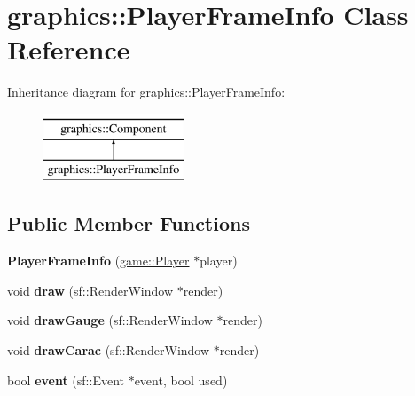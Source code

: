 \hypertarget{classgraphics_1_1_player_frame_info}{\section{graphics\-:\-:Player\-Frame\-Info Class Reference}
\label{classgraphics_1_1_player_frame_info}
}
Inheritance diagram for graphics\-:\-:Player\-Frame\-Info\-:\begin{figure}[H]
\begin{center}
\leavevmode
\includegraphics[height=2.000000cm]{classgraphics_1_1_player_frame_info}
\end{center}
\end{figure}
\subsection*{Public Member Functions}
\begin{DoxyCompactItemize}
\item 
\hypertarget{classgraphics_1_1_player_frame_info_ae413df869e650179c59630f6752cf22e}{{\bfseries Player\-Frame\-Info} (\hyperlink{classgame_1_1_player}{game\-::\-Player} $\ast$player)}\label{classgraphics_1_1_player_frame_info_ae413df869e650179c59630f6752cf22e}

\item 
\hypertarget{classgraphics_1_1_player_frame_info_a061f76d677adfaf0e78447e22910b216}{void {\bfseries draw} (sf\-::\-Render\-Window $\ast$render)}\label{classgraphics_1_1_player_frame_info_a061f76d677adfaf0e78447e22910b216}

\item 
\hypertarget{classgraphics_1_1_player_frame_info_ade812df573aa56abec678b8b522454ff}{void {\bfseries draw\-Gauge} (sf\-::\-Render\-Window $\ast$render)}\label{classgraphics_1_1_player_frame_info_ade812df573aa56abec678b8b522454ff}

\item 
\hypertarget{classgraphics_1_1_player_frame_info_aa5d6f57bc89f57b52b52cfc9ffeb793e}{void {\bfseries draw\-Carac} (sf\-::\-Render\-Window $\ast$render)}\label{classgraphics_1_1_player_frame_info_aa5d6f57bc89f57b52b52cfc9ffeb793e}

\item 
\hypertarget{classgraphics_1_1_player_frame_info_a0bfd773afd7c760f97eb866a578549fd}{bool {\bfseries event} (sf\-::\-Event $\ast$event, bool used)}\label{classgraphics_1_1_player_frame_info_a0bfd773afd7c760f97eb866a578549fd}

\end{DoxyCompactItemize}
